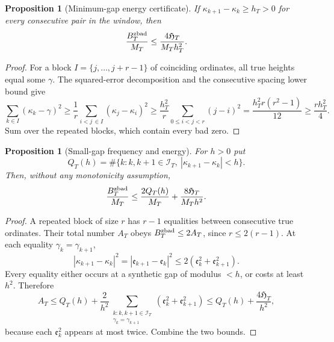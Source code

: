 \documentclass[11pt,reqno]{amsart}
\numberwithin{equation}{section}
\newtheorem{proposition}[theorem]{Proposition}
\begin{document}
\begin{proposition}[Minimum-gap energy certificate]
\label{prop:mingapcertificate}
If $\kappa_{k+1}-\kappa_k\ge h_T>0$ for every consecutive pair in
the window, then
\begin{equation}\label{eq:mingapcertificate}
\frac{B_T^{\rm zbad}}{M_T}\le
\frac{4\mathfrak H_T}{M_T h_T^2}.
\end{equation}
\end{proposition}
\begin{proof}
For a block $I=\{j,\dots,j+r-1\}$ of coinciding ordinates,
all true heights equal some $\gamma$. The squared-error decomposition
and the consecutive spacing lower bound give
\[
\sum_{k\in I}(\kappa_k-\gamma)^2
\ge\frac1r\sum_{i<j\,\in I}(\kappa_j-\kappa_i)^2
\ge\frac{h_T^2}{r}\sum_{0\le i<j<r}(j-i)^2
=\frac{h_T^2r(r^2-1)}{12}\ge\frac{rh_T^2}{4}.
\]
Sum over the repeated blocks, which contain every bad zero.
\end{proof}

\begin{proposition}[Small-gap frequency and energy]
\label{prop:smallgapcertificate}
For $h>0$ put
\[
 Q_T(h)=\#\{k:k,k+1\in\mathcal I_T,
  \ |\kappa_{k+1}-\kappa_k|<h\}.
\]
Then, without any monotonicity assumption,
\begin{equation}\label{eq:smallgapcertificate}
 \frac{B_T^{\rm zbad}}{M_T}\le
 \frac{2Q_T(h)}{M_T}+\frac{8\mathfrak H_T}{M_T h^2}.
\end{equation}
\end{proposition}
\begin{proof}
A repeated block of size $r$ has $r-1$ equalities between consecutive
true ordinates. Their total number $A_T$ obeys
$B_T^{\rm zbad}\le2A_T$, since $r\le2(r-1)$.
At each equality $\gamma_k=\gamma_{k+1}$,
\[
 |\kappa_{k+1}-\kappa_k|^2
 =|\mathfrak e_{k+1}-\mathfrak e_k|^2\le2(\mathfrak e_k^2+\mathfrak e_{k+1}^2).
\]
Every equality either occurs at a synthetic gap of modulus $<h$,
or costs at least $h^2$. Therefore
\[
 A_T\le Q_T(h)+\frac2{h^2}
\sum_{\substack{k:k,k+1\in\mathcal I_T\\\gamma_k=\gamma_{k+1}}}
(\mathfrak e_k^2+\mathfrak e_{k+1}^2)
\le Q_T(h)+\frac{4\mathfrak H_T}{h^2},
\]
because each $\mathfrak e_k^2$ appears at most twice. Combine the two bounds.
\end{proof}
\end{document}
